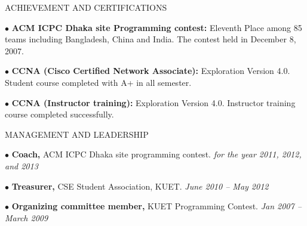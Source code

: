 \documentclass{resume} %
\begin{document}
\begin{rSection}{ACHIEVEMENT AND CERTIFICATIONS}

\begin{rSubsection}{}{}{}{}
\item[$\bullet$] {\bf ACM ICPC Dhaka site Programming contest:} Eleventh Place among 85 teams including Bangladesh, China and India. The contest held in December 8, 2007.
\item[$\bullet$] {\bf CCNA (Cisco Certified Network Associate):} Exploration Version 4.0. Student course completed with A+ in all semester.
\item[$\bullet$] {\bf CCNA (Instructor training):} Exploration Version 4.0. Instructor training course completed successfully.

\end{rSubsection}




\end{rSection}


\begin{rSection}{MANAGEMENT AND LEADERSHIP}

\begin{rSubsection}{}{}{}{}
\item[$\bullet$]{\bf Coach,} ACM ICPC Dhaka site programming contest. \hfill {\em for the year 2011, 2012, and 2013}
\item[$\bullet$] {\bf Treasurer,} CSE Student Association, KUET. \hfill {\em June 2010 – May 2012}
\item[$\bullet$] {\bf Organizing committee member,} KUET Programming Contest. \hfill {\em Jan 2007 – March 2009}
\end{rSubsection}

\end{rSection}


\end{document}
